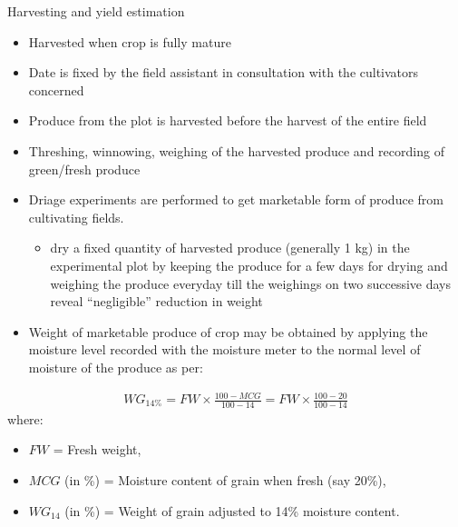 \documentclass[11pt,dvipsnames,ignorenonframetext,aspectratio=169]{beamer}
\providecommand{\tightlist}{%
  \setlength{\itemsep}{0pt}\setlength{\parskip}{0pt}}
\begin{document}
\begin{frame}{Harvesting and yield estimation}
\protect\hypertarget{harvesting-and-yield-estimation}{}
\begin{itemize}
\tightlist
\item
  Harvested when crop is fully mature
\item
  Date is fixed by the field assistant in consultation with the
  cultivators concerned
\item
  Produce from the plot is harvested before the harvest of the entire
  field
\item
  Threshing, winnowing, weighing of the harvested produce and recording
  of green/fresh produce
\item
  Driage experiments are performed to get marketable form of produce
  from cultivating fields.

  \begin{itemize}
  \tightlist
  \item
    dry a fixed quantity of harvested produce (generally 1 kg) in the
    experimental plot by keeping the produce for a few days for drying
    and weighing the produce everyday till the weighings on two
    successive days reveal ``negligible'' reduction in weight
  \end{itemize}
\end{itemize}
\end{frame}

\begin{frame}{}
\protect\hypertarget{section-1}{}
\begin{itemize}
\tightlist
\item
  Weight of marketable produce of crop may be obtained by applying the
  moisture level recorded with the moisture meter to the normal level of
  moisture of the produce as per:
\end{itemize}

\[
\begin{aligned}
WG_{14\%} = FW \times \frac{100-MCG}{100-14} = FW \times \frac{100-20}{100-14}
\end{aligned}
\] where:

\footnotesize

\begin{itemize}
\tightlist
\item
  \(FW\) = Fresh weight,
\item
  \(MCG\) (in \%) = Moisture content of grain when fresh (say 20\%),
\item
  \(WG_{14}\) (in \%) = Weight of grain adjusted to 14\% moisture
  content.
\end{itemize}
\end{frame}
\end{document}
